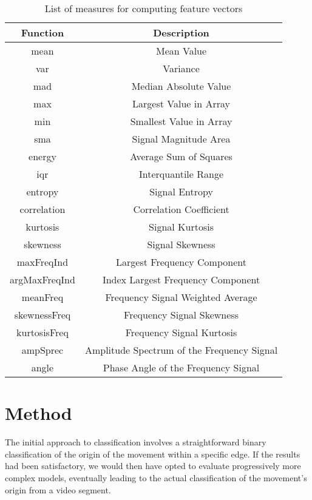 \begin{table}[H]
    \centering
    \begin{tabular}{|c|c|}
    \hline
    \textbf{Function} & \textbf{Description} \\
    \hline
    mean & Mean Value \\
    var & Variance \\
    mad & Median Absolute Value \\
    max & Largest Value in Array \\
    min & Smallest Value in Array \\
    sma & Signal Magnitude Area \\
    energy & Average Sum of Squares \\
    iqr & Interquantile Range \\
    entropy & Signal Entropy \\
    correlation & Correlation Coefficient \\
    kurtosis & Signal Kurtosis \\
    skewness & Signal Skewness \\
    maxFreqInd & Largest Frequency Component \\
    argMaxFreqInd & Index Largest Frequency Component \\
    meanFreq & Frequency Signal Weighted Average \\
    skewnessFreq & Frequency Signal Skewness \\
    kurtosisFreq & Frequency Signal Kurtosis \\
    ampSprec & Amplitude Spectrum of the Frequency Signal \\
    angle & Phase Angle of the Frequency Signal \\
    \hline
    \end{tabular}
    \caption{List of measures for computing feature vectors}
\label{tab:ml_features}
\end{table}

\section{Method}

The initial approach to classification involves a straightforward binary classification of the origin of the movement within a specific edge.
If the results had been satisfactory, we would then have opted to evaluate progressively more complex models, eventually leading to the actual classification of the movement's origin from a video segment.


